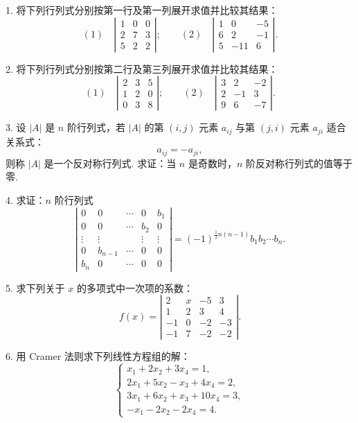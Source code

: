 \documentclass[UTF8, 12pt, fontset=fandol, oneside]{ctexart}
\begin{document}
1. 将下列行列式分别按第一行及第一列展开求值并比较其结果：
\[
(1)\quad
\left|\begin{array}{ccc}
1 & 0 & 0\\
2 & 7 & 3\\
5 & 2 & 2
\end{array}\right|;
\qquad
(2)\quad
\left|\begin{array}{ccc}
1 & 0 & -5\\
6 & 2 & -1\\
5 & -11 & 6
\end{array}\right|.
\]

2. 将下列行列式分别按第二行及第三列展开求值并比较其结果：
\[
(1)\quad
\left|\begin{array}{ccc}
2 & 3 & 5\\
1 & 2 & 0\\
0 & 3 & 8
\end{array}\right|;
\qquad
(2)\quad
\left|\begin{array}{ccc}
3 & 2 & -2\\
2 & -1 & 3\\
9 & 6 & -7
\end{array}\right|.
\]

3. 设 $|A|$ 是 $n$ 阶行列式，若 $|A|$ 的第 $(i,j)$ 元素 $a_{ij}$ 与第 $(j,i)$ 元素 $a_{ji}$ 适合关系式：
\[
a_{ij}=-a_{ji},
\]
则称 $|A|$ 是一个反对称行列式. 求证：当 $n$ 是奇数时，$n$ 阶反对称行列式的值等于零.

4. 求证：$n$ 阶行列式
\[
\left|\begin{array}{ccccc}
0 & 0 & \cdots & 0 & b_1\\
0 & 0 & \cdots & b_2 & 0\\
\vdots & \vdots & & \vdots & \vdots\\
0 & b_{n-1} & \cdots & 0 & 0\\
b_n & 0 & \cdots & 0 & 0
\end{array}\right|
=(-1)^{\frac{1}{2}n(n-1)}b_1b_2\cdots b_n.
\]

5. 求下列关于 $x$ 的多项式中一次项的系数：
\[
f(x)=
\left|\begin{array}{cccc}
2 & x & -5 & 3\\
1 & 2 & 3 & 4\\
-1 & 0 & -2 & -3\\
-1 & 7 & -2 & -2
\end{array}\right|.
\]

6. 用 Cramer 法则求下列线性方程组的解：
\[
\left\{
\begin{array}{l}
x_1+2x_2+3x_4=1,\\
2x_1+5x_2-x_3+4x_4=2,\\
3x_1+6x_2+x_3+10x_4=3,\\
-x_1-2x_2-2x_4=4.
\end{array}
\right.
\]
\end{document}
